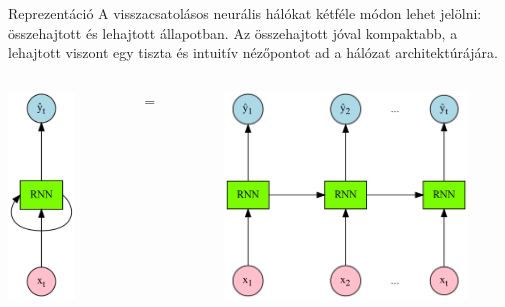 \documentclass[english, aspectratio=169]{beamer}
\begin{document}
\begin{frame}{Reprezentáció}
A visszacsatolásos neurális hálókat kétféle módon lehet jelölni: összehajtott és lehajtott állapotban. Az összehajtott jóval kompaktabb, a lehajtott viszont egy tiszta és intuitív nézőpontot ad a hálózat architektúrájára.
\begin{columns}
\begin{column}{.2\textwidth}
\begin{center}
\includegraphics[height=5.5cm, width=\textwidth, keepaspectratio]{graphs/recurrent_3.png}
\end{center}
\end{column}
\begin{column}{.1\textwidth}
\begin{center}
\begin{Huge}
$=$
\end{Huge}
\end{center}
\end{column}
\begin{column}{.7\textwidth}
\begin{center}
\includegraphics[height=5.5cm, width=\textwidth, keepaspectratio]{graphs/recurrent_4.png}
\end{center}
\end{column}
\end{columns}
\end{frame}
\end{document}
